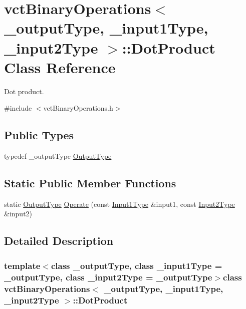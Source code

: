 \hypertarget{classvct_binary_operations_1_1_dot_product}{}\section{vct\+Binary\+Operations$<$ \+\_\+output\+Type, \+\_\+input1\+Type, \+\_\+input2\+Type $>$\+:\+:Dot\+Product Class Reference}
\label{classvct_binary_operations_1_1_dot_product}


Dot product.  




{\ttfamily \#include $<$vct\+Binary\+Operations.\+h$>$}

\subsection*{Public Types}
\begin{DoxyCompactItemize}
\item 
typedef \+\_\+output\+Type \hyperlink{classvct_binary_operations_1_1_dot_product_a87bd488ca8bd04bf65be037778c285dc}{Output\+Type}
\end{DoxyCompactItemize}
\subsection*{Static Public Member Functions}
\begin{DoxyCompactItemize}
\item 
static \hyperlink{classvct_binary_operations_1_1_dot_product_a87bd488ca8bd04bf65be037778c285dc}{Output\+Type} \hyperlink{classvct_binary_operations_1_1_dot_product_a6d3fec89851f31cc487b4f332c9b0cc9}{Operate} (const \hyperlink{classvct_binary_operations_a5e56a66a012d6a28c539a08a0021c45e}{Input1\+Type} \&input1, const \hyperlink{classvct_binary_operations_a929119af557a04a16b4d854981e49e1b}{Input2\+Type} \&input2)
\end{DoxyCompactItemize}


\subsection{Detailed Description}
\subsubsection*{template$<$class \+\_\+output\+Type, class \+\_\+input1\+Type = \+\_\+output\+Type, class \+\_\+input2\+Type = \+\_\+output\+Type$>$class vct\+Binary\+Operations$<$ \+\_\+output\+Type, \+\_\+input1\+Type, \+\_\+input2\+Type $>$\+::\+Dot\+Product}

